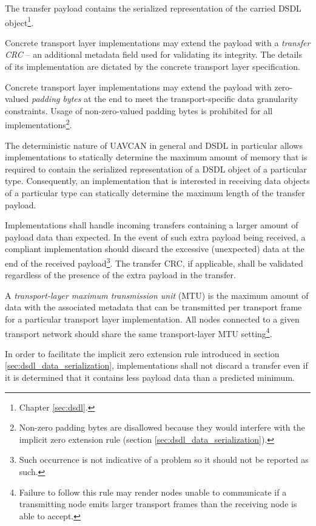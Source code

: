 The transfer payload contains the serialized representation of the carried
DSDL object\footnote{Chapter \ref{sec:dsdl}.}.

Concrete transport layer implementations may extend the payload with a \emph{transfer CRC}
-- an additional metadata field used for validating its integrity.
The details of its implementation are dictated by the concrete transport layer specification.

Concrete transport layer implementations may extend the payload with zero-valued \emph{padding bytes} at the end
to meet the transport-specific data granularity constraints.
Usage of non-zero-valued padding bytes is prohibited for all implementations\footnote{%
    Non-zero padding bytes are disallowed because they would interfere with the implicit zero extension rule
    (section \ref{sec:dsdl_data_serialization}).
}.

The deterministic nature of UAVCAN in general and DSDL in particular allows implementations to statically determine
the maximum amount of memory that is required to contain the serialized representation
of a DSDL object of a particular type.
Consequently, an implementation that is interested in receiving data objects of a particular type
can statically determine the maximum length of the transfer payload.

Implementations shall handle incoming transfers containing a larger amount of payload data than expected.
In the event of such extra payload being received, a compliant implementation should
discard the excessive (unexpected) data at the end of the received payload\footnote{%
    Such occurrence is not indicative of a problem so it should not be reported as such.
}.
The transfer CRC, if applicable, shall be validated regardless of the presence of the extra payload in the transfer.

A \emph{transport-layer maximum transmission unit} (MTU) is the maximum amount of data with the associated metadata
that can be transmitted per transport frame for a particular transport layer implementation.
All nodes connected to a given transport network should share the same transport-layer MTU setting\footnote{%
    Failure to follow this rule may render nodes unable to communicate if a transmitting node emits larger transport
    frames than the receiving node is able to accept.
}.

In order to facilitate the implicit zero extension rule introduced in section \ref{sec:dsdl_data_serialization},
implementations shall not discard a transfer even if it is determined that it contains less payload
data than a predicted minimum.

